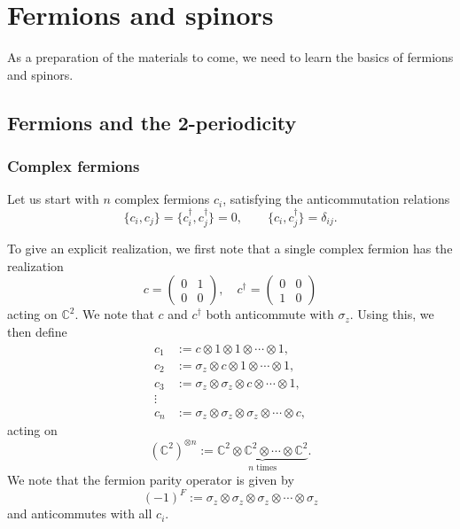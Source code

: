 \documentclass[12pt]{article}
\numberwithin{equation}{section}
\numberwithin{figure}{section}
\theoremstyle{remark}
\def\bC{\mathbb{C}}
\begin{document}
\section{Fermions and spinors}

As a preparation of the materials to come, we need to learn the basics of 
fermions and spinors.

\subsection{Fermions and the 2-periodicity}
\subsubsection{Complex fermions}
Let us start with $n$ complex fermions $c_i$, satisfying the anticommutation relations \begin{equation}
\{c_i , c_j\}=\{c_i^\dagger,c_j^\dagger\}=0,\qquad
\{c_i,c_j^\dagger\}=\delta_{ij}.
\end{equation}

To give an explicit realization, we first note that a single complex fermion has the realization
\begin{equation}
c=\begin{pmatrix}
0 & 1 \\
0 & 0 
\end{pmatrix},\quad
c^\dagger=\begin{pmatrix}
0 & 0\\
1 & 0
\end{pmatrix}
\end{equation} acting on $\bC^2$.
We note that $c$ and $c^\dagger$ both anticommute with $\sigma_z$.
Using this, we then define \begin{equation}
\begin{aligned}
c_1 &:= c \otimes 1 \otimes 1\otimes \cdots \otimes 1 ,\\
c_2 &:= \sigma_z \otimes c \otimes 1\otimes \cdots \otimes 1 ,\\
c_3 &:= \sigma_z \otimes \sigma_z \otimes c \otimes \cdots \otimes 1 ,\\
\vdots \\
c_n &:= \sigma_z \otimes\sigma_z \otimes \sigma_z \otimes\cdots\otimes c,
\end{aligned} 
\label{complex-fermions}
\end{equation} acting on \begin{equation}
(\bC^2)^{\otimes n} := \underbrace{\bC^2\otimes \bC^2\otimes \cdots \otimes \bC^2}_\text{$n$ times}.
\end{equation}
We note that the fermion parity operator is given by \begin{equation}
(-1)^F := \sigma_z \otimes\sigma_z \otimes \sigma_z \otimes\cdots\otimes \sigma_z
\end{equation}
and anticommutes with all $c_i$.
\end{document}
